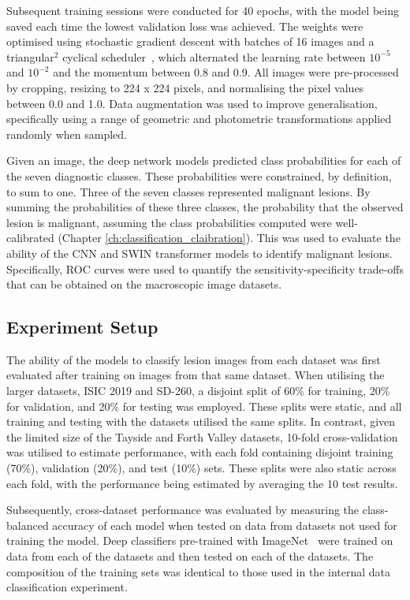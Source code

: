 
Subsequent training sessions were conducted for 40 epochs, with the model being saved each time the lowest validation loss was achieved. The weights were optimised using stochastic gradient descent with batches of 16 images and a triangular$^2$ cyclical scheduler~\citep{smith2017cyclical}, which alternated the learning rate between $10^{-5}$ and $10^{-2}$ and the momentum between 0.8 and 0.9. All images were pre-processed by cropping, resizing to 224 x 224 pixels, and normalising the pixel values between 0.0 and 1.0. Data augmentation was used to improve generalisation, specifically using a range of geometric and photometric transformations applied randomly when sampled.

Given an image, the deep network models predicted class probabilities for each of the seven diagnostic classes. These probabilities were constrained, by definition, to sum to one. Three of the seven classes represented malignant lesions. By summing the probabilities of these three classes, the probability that the observed lesion is malignant, assuming the class probabilities computed were well-calibrated (Chapter \ref{ch:classification_claibration}). This was used to evaluate the ability of the CNN and SWIN transformer models to identify malignant lesions. Specifically, ROC curves were used to quantify the sensitivity-specificity trade-offs that can be obtained on the macroscopic image datasets. 

\subsection{Experiment Setup}
\label{subsec:generalisation_experiment}
The ability of the models to classify lesion images from each dataset was first evaluated after training on images from that same dataset. When utilising the larger datasets, ISIC 2019 and SD-260, a disjoint split of 60\% for training, 20\% for validation, and 20\% for testing was employed. These splits were static, and all training and testing with the datasets utilised the same splits. In contrast, given the limited size of the Tayside and Forth Valley datasets, 10-fold cross-validation was utilised to estimate performance, with each fold containing disjoint training (70\%), validation (20\%), and test (10\%) sets. These splits were also static across each fold, with the performance being estimated by averaging the 10 test results.

Subsequently, cross-dataset performance was evaluated by measuring the class-balanced accuracy of each model when tested on data from datasets not used for training the model. Deep classifiers pre-trained with ImageNet~\citep{deng2009imagenet} were trained on data from each of the datasets and then tested on each of the datasets. The composition of the training sets was identical to those used in the internal data classification experiment.

